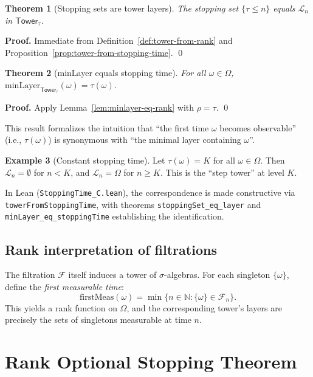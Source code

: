\documentclass[11pt]{article}
\newtheorem{theorem}{Theorem}[section]
\theoremstyle{definition}
\newtheorem{example}[theorem]{Example}
\theoremstyle{remark}
\newcommand{\layer}{\mathcal{L}}
\newcommand{\minLayer}{\mathrm{minLayer}}
\newcommand{\Tower}{\mathsf{Tower}}
\newcommand{\Filtration}{\mathcal{F}}
\newcommand{\NN}{\mathbb{N}}
\begin{document}
\begin{theorem}[Stopping sets are tower layers]
\label{thm:stopping-set-eq-layer}
The stopping set $\{\tau \leq n\}$ equals $\layer_n$ in $\Tower_\tau$.
\end{theorem}

\noindent\textbf{Proof.}
Immediate from Definition~\ref{def:tower-from-rank} and Proposition~\ref{prop:tower-from-stopping-time}.
\qed

\begin{theorem}[minLayer equals stopping time]
\label{thm:minlayer-eq-stopping}
For all $\omega \in \Omega$, $\minLayer_{\Tower_\tau}(\omega) = \tau(\omega)$.
\end{theorem}

\noindent\textbf{Proof.}
Apply Lemma~\ref{lem:minlayer-eq-rank} with $\rho = \tau$.
\qed

This result formalizes the intuition that ``the first time $\omega$ becomes observable'' (i.e., $\tau(\omega)$) is synonymous with ``the minimal layer containing $\omega$''.

\begin{example}[Constant stopping time]
\label{ex:constant-stopping}
Let $\tau(\omega) = K$ for all $\omega \in \Omega$.
Then $\layer_n = \emptyset$ for $n < K$, and $\layer_n = \Omega$ for $n \geq K$.
This is the ``step tower'' at level $K$.
\end{example}

In Lean (\texttt{StoppingTime\_C.lean}), the correspondence is made constructive via \texttt{towerFromStoppingTime}, with theorems \texttt{stoppingSet\_eq\_layer} and \texttt{minLayer\_eq\_stoppingTime} establishing the identification.

\subsection{Rank interpretation of filtrations}

The filtration $\Filtration$ itself induces a tower of $\sigma$-algebras.
For each singleton $\{\omega\}$, define the \emph{first measurable time}:
\[
\mathrm{firstMeas}(\omega) = \min\{n \in \NN : \{\omega\} \in \Filtration_n\}.
\]
This yields a rank function on $\Omega$, and the corresponding tower's layers are precisely the sets of singletons measurable at time $n$.

\section{Rank Optional Stopping Theorem}
\label{sec:rank-ost}
\end{document}
